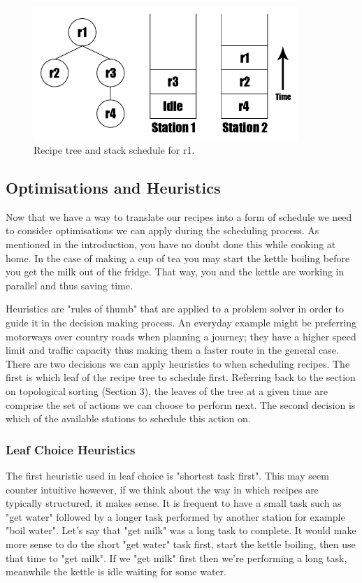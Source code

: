 \documentclass[11pt]{article}
\begin{document}
\begin{figure}[h]
\includegraphics[width=10cm, keepaspectratio]{stacks.png}
\centering
\caption{Recipe tree and stack schedule for r1.}
\end{figure}

\subsection{Optimisations and Heuristics}

Now that we have a way to translate our recipes into a form of schedule we need to consider
optimisations we can apply during the scheduling process. As mentioned in the introduction,
you have no doubt done this while cooking at home. In the case of making a cup of tea you
may start the kettle boiling before you get the milk out of the fridge. That way, you and
the kettle are working in parallel and thus saving time.

\medbreak

Heuristics are "rules of thumb" that are applied to a problem solver in order to guide it
in the decision making process. An everyday example might be preferring motorways over country roads
when planning a journey; they have a higher speed limit and traffic capacity thus making
them a faster route in the general case. There are two decisions we can apply heuristics to
when scheduling recipes. The first is which leaf of the recipe tree to schedule first.
Referring back to the section on topological sorting (Section 3), the leaves of the tree at a given time
are comprise the set of actions we can choose to perform next. The second decision is which
of the available stations to schedule this action on.

\subsubsection{Leaf Choice Heuristics}

The first heuristic used in leaf choice is "shortest task first". This may seem counter intuitive however,
if we think about the way in which recipes are typically structured, it makes sense. It is frequent
to have a small task such as "get water" followed by a longer task performed by another station
for example "boil water". Let's say that "get milk" was a long task to complete. It would make more
sense to do the short "get water" task first, start the kettle boiling, then use that time to
"get milk". If we "get milk" first then we're performing a long task, meanwhile the kettle is idle
waiting for some water.
\end{document}
